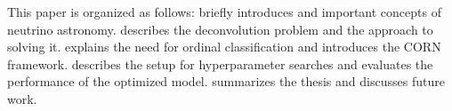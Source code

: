 This paper is organized as follows:
 briefly introduces \icecube{} and important concepts of neutrino astronomy.
 describes the deconvolution problem and the \dsea{} approach to solving it.
 explains the need for ordinal classification and introduces the \ac{CORN} framework.
 describes the setup for hyperparameter searches and evaluates the performance of the optimized model.
 summarizes the thesis and discusses future work.
